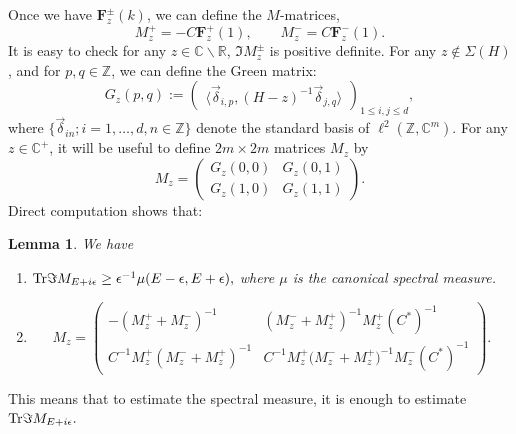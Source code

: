 \documentclass[11pt]{amsart}
\newtheorem{lemma}[theorem]{Lemma}
\theoremstyle{remark}
\theoremstyle{definition}
\newcommand{\C}{{\mathbf C}}
\newcommand{\ZZ}{{\mathbb Z}}
\newcommand{\tr}{{\rm Tr}}
\def \C{{\mathcal{C}}}
\def\C{{\mathbb C}}
\begin{document}
Once we have $\mathbf{F}^{\pm}_z(k)$, we can define the $M$-matrices,
$$
M^+_z=-C\mathbf{F}^+_z(1), \qquad 
M^-_z=C\mathbf{F}^-_z(1).
$$
It is easy to check for any $z\in\mathbb{C}\backslash\mathbb{R}$, $\Im M_z^\pm$ is positive definite.
For any  $z\notin \Sigma(H)$,  and for $p,q\in \ZZ$, we can define the Green matrix: $$G_z(p,q):=\begin{pmatrix}
	\langle \vec{\delta}_{i,p},(H-z)^{-1}\vec{\delta}_{j,q}\rangle
\end{pmatrix}_{1\leq i,j\leq d},$$  where $\{\vec{\delta}_{in}; i=1,\ldots,d, n\in\mathbb{Z}\}$ denote the standard basis of $\ell^2(\mathbb{Z},\C^m)$.
For any $z\in\mathbb{C}^+$, it will be useful to define $2m\times2m$ matrices $M_z$ by
\begin{equation*}
  M_z=  \begin{pmatrix}
    G_z(0,0)&G_z(0,1)\\
    G_z(1,0)&G_z(1,1)
\end{pmatrix}.
\end{equation*}
Direct computation shows that:
\begin{lemma}\label{spm}\cite{KS}We have 
\begin{enumerate}
\item  $\tr\Im M_{E+i\epsilon} \geq \epsilon^{-1} \mu(E-\epsilon, E+\epsilon),$  where  $\mu$ is the canonical spectral measure. 
\item
\begin{equation*}
  M_z=\begin{pmatrix}
    -(M_z^++M_z^-)^{-1}&\left(M_z^{-} + M_z^{+}\right)^{-1} M_z^{+}(C^*)^{-1}\\
    C^{-1} M_z^{+} \left(M_z^{-} + M_z^{+}\right)^{-1}&C^{-1}M_z^+\big(M_z^-+M_z^+\big)^{-1}M_z^-(C^*)^{-1}
\end{pmatrix}.
\end{equation*}
\end{enumerate}
\end{lemma}

This means that to estimate the spectral measure, it is enough to estimate 
$\tr\Im M_{E+i\epsilon}.$
\end{document}
